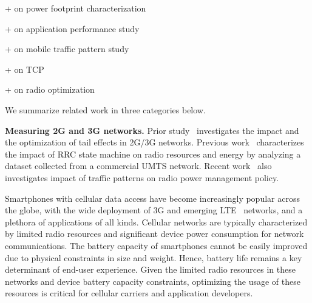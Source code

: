 + on power footprint characterization

+ on application performance study

+ on mobile traffic pattern study

+ on TCP

+ on radio optimization









We summarize related work in three categories below.

\textbf{Measuring 2G and 3G networks.} Prior study~\cite{imc.tailender} investigates the impact and the optimization of tail effects in 2G/3G networks. Previous work~\cite{imc.3g} characterizes the impact of RRC state machine on radio resources and energy by analyzing a dataset collected from a commercial UMTS network. Recent work~\cite{falaki10_imc} also investigates impact of traffic patterns on radio power management policy. 






Smartphones with cellular data access have become increasingly popular across the globe, with the wide deployment of 3G and emerging LTE~\cite{3gpp.lte} networks, and a plethora of applications of all kinds. Cellular networks are typically characterized by limited radio resources and significant device power consumption for network communications. The battery capacity of smartphones cannot be easily improved due to physical constraints in size and weight. Hence, battery life remains a key determinant of end-user experience. Given the limited radio resources in these networks and device battery capacity constraints, optimizing the usage of these resources is critical for cellular carriers and application developers.

